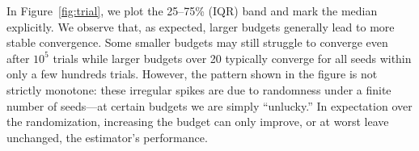 In Figure~\ref{fig:trial}, we plot the 25–75\% (IQR) band and mark the median explicitly. We observe that, as expected, larger budgets generally lead to more stable convergence. Some smaller budgets may still struggle to converge even after $10^5$ trials while larger budgets over 20 typically converge for all seeds within only a few hundreds trials. 
%
However, the pattern shown in the figure is not strictly monotone:  these irregular spikes are due to randomness under a finite number of seeds—at certain budgets we are simply ``unlucky.” In expectation over the randomization, increasing the budget can only improve, or at worst leave unchanged, the estimator’s performance.


%

